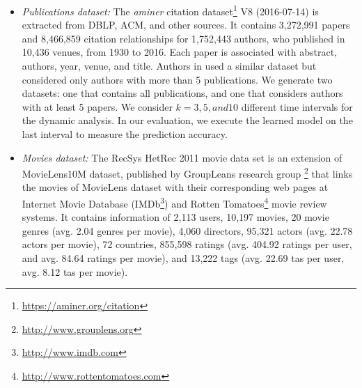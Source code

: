 \begin{itemize}
    \item \textit{Publications dataset:} The \textit{aminer} citation dataset\footnote{\url{https://aminer.org/citation}} V8 (2016-07-14) is extracted from DBLP, ACM, and other sources. It contains 3,272,991 papers and 8,466,859 citation relationships for 1,752,443 authors, who published in 10,436 venues, from 1930 to 2016. Each paper is associated with abstract, authors, year, venue, and title.  Authors in \cite{sun2011ASONAM} used a similar dataset but considered only authors with more than 5 publications. We generate two datasets: one that contains all publications, and one that considers authors with at least 5 papers. We consider $k=3, 5, and 10$ different time intervals for the dynamic analysis. In our evaluation, we execute the learned model on the last interval to measure the prediction accuracy.
    
    \item \textit{Movies dataset:} The RecSys HetRec 2011 movie data set \cite{Cantador:RecSys2011} is an extension of MovieLens10M dataset, published by GroupLeans research group \footnote{\url{http://www.grouplens.org}} that links the movies of MovieLens dataset with their corresponding web pages at Internet Movie Database (IMDb\footnote{\url{http://www.imdb.com}}) and Rotten Tomatoes\footnote{\url{http://www.rottentomatoes.com}} movie review systems. It contains information of 2,113 users, 10,197 movies, 20 movie genres (avg. 2.04 genres per movie), 4,060 directors, 95,321 actors (avg. 22.78 actors per movie), 72 countries, 855,598 ratings (avg. 404.92 ratings per user, and avg. 84.64 ratings per movie), and 13,222 tags (avg. 22.69 tas per user, avg. 8.12 tas per movie).

\end{itemize}



